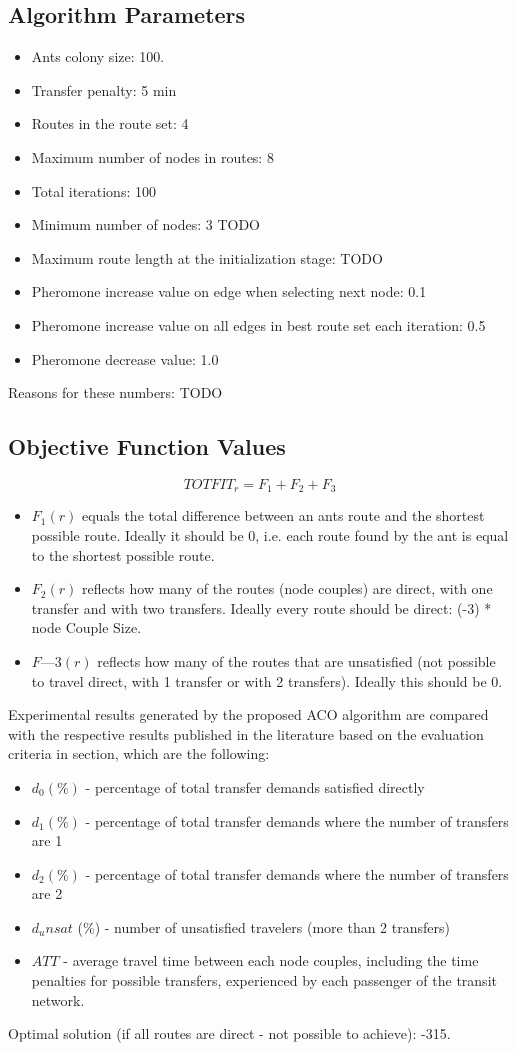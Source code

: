 \subsection{Algorithm Parameters}

\begin{itemize}
\item Ants colony size: 100.
\item Transfer penalty: 5 min
\item Routes in the route set: 4
\item Maximum number of nodes in routes: 8
\item Total iterations: 100
\item Minimum number of nodes: 3 TODO
\item Maximum route length at the initialization stage: TODO
\item Pheromone increase value on edge when selecting next node: 0.1
\item Pheromone increase value on all edges in best route set each iteration: 0.5
\item Pheromone decrease value: 1.0
\end{itemize}
Reasons for these numbers: TODO

\subsection{Objective Function Values}
$$TOTFIT_{r} = F_{1} + F_{2} + F_{3}$$
\begin{itemize}
\item $F_{1}(r)$ equals the total difference between an ants route and the shortest possible route. Ideally it should be 0, i.e. each route found by the ant is equal to the shortest possible route.
\item $F_{2}(r)$ reflects how many of the routes (node couples) are direct, with one transfer and with two transfers. Ideally every route should be direct: (-3) * node Couple Size. 
\item $F—{3}(r)$ reflects how many of the routes that are unsatisfied (not possible to travel direct, with 1 transfer or with 2 transfers). Ideally this should be 0.
\end{itemize}

Experimental results generated by the proposed ACO algorithm are compared with the respective results published in the literature based on the evaluation criteria in section, which are the following:
\begin{itemize}
\item $d_0 (\%)$ - percentage of total transfer demands satisfied directly
\item $d_1 (\%)$ - percentage of total transfer demands where the number of transfers are 1
\item $d_2 (\%)$ - percentage of total transfer demands where the number of transfers are 2
\item $d_unsat$ (\%) - number of unsatisfied travelers (more than 2 transfers)
\item $ATT$  - average travel time between each node couples, including the time penalties for possible transfers, experienced by each passenger of the transit network.
\end{itemize}

Optimal solution (if all routes are direct - not possible to achieve): -315.